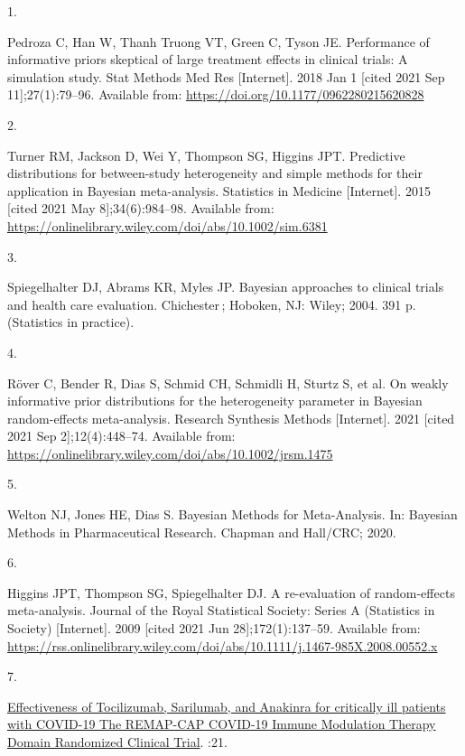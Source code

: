 \documentclass[
  12pt,
]{article}
\newlength{\cslhangindent}
\newlength{\csllabelwidth}
\newlength{\cslentryspacingunit} %
\newenvironment{CSLReferences}[2] %
 {%
  \setlength{\parindent}{0pt}
  \ifodd #1
  \let\oldpar\par
  \def\par{\hangindent=\cslhangindent\oldpar}
  \fi
  \setlength{\parskip}{#2\cslentryspacingunit}
 }%
 {}
\newcommand{\CSLLeftMargin}[1]{\parbox[t]{\csllabelwidth}{#1}}
\newcommand{\CSLRightInline}[1]{\parbox[t]{\linewidth - \csllabelwidth}{#1}\break}
\begin{document}
\hypertarget{refs}{}
\begin{CSLReferences}{0}{0}
\leavevmode{}%
\CSLLeftMargin{1. }
\CSLRightInline{Pedroza C, Han W, Thanh Truong VT, Green C, Tyson JE.
Performance of informative priors skeptical of large treatment effects
in clinical trials: A simulation study. Stat Methods Med Res
{[}Internet{]}. 2018 Jan 1 {[}cited 2021 Sep 11{]};27(1):79--96.
Available from: \url{https://doi.org/10.1177/0962280215620828}}

\leavevmode{}%
\CSLLeftMargin{2. }
\CSLRightInline{Turner RM, Jackson D, Wei Y, Thompson SG, Higgins JPT.
Predictive distributions for between-study heterogeneity and simple
methods for their application in Bayesian meta-analysis. Statistics in
Medicine {[}Internet{]}. 2015 {[}cited 2021 May 8{]};34(6):984--98.
Available from:
\url{https://onlinelibrary.wiley.com/doi/abs/10.1002/sim.6381}}

\leavevmode{}%
\CSLLeftMargin{3. }
\CSLRightInline{Spiegelhalter DJ, Abrams KR, Myles JP. Bayesian
approaches to clinical trials and health care evaluation. Chichester\,;
Hoboken, NJ: Wiley; 2004. 391 p. (Statistics in practice). }

\leavevmode{}%
\CSLLeftMargin{4. }
\CSLRightInline{Röver C, Bender R, Dias S, Schmid CH, Schmidli H, Sturtz
S, et al. On weakly informative prior distributions for the
heterogeneity parameter in Bayesian random-effects meta-analysis.
Research Synthesis Methods {[}Internet{]}. 2021 {[}cited 2021 Sep
2{]};12(4):448--74. Available from:
\url{https://onlinelibrary.wiley.com/doi/abs/10.1002/jrsm.1475}}

\leavevmode{}%
\CSLLeftMargin{5. }
\CSLRightInline{Welton NJ, Jones HE, Dias S. Bayesian Methods for
Meta-Analysis. In: Bayesian Methods in Pharmaceutical Research. Chapman
and Hall/CRC; 2020. }

\leavevmode{}%
\CSLLeftMargin{6. }
\CSLRightInline{Higgins JPT, Thompson SG, Spiegelhalter DJ. A
re-evaluation of random-effects meta-analysis. Journal of the Royal
Statistical Society: Series A (Statistics in Society) {[}Internet{]}.
2009 {[}cited 2021 Jun 28{]};172(1):137--59. Available from:
\url{https://rss.onlinelibrary.wiley.com/doi/abs/10.1111/j.1467-985X.2008.00552.x}}

\leavevmode{}%
\CSLLeftMargin{7. }
\CSLRightInline{\href{https://doi.org/10.1101/2021.06.18.21259133}{Effectiveness
of Tocilizumab, Sarilumab, and Anakinra for critically ill patients with
COVID-19 The REMAP-CAP COVID-19 Immune Modulation Therapy Domain
Randomized Clinical Trial}. :21. }


\end{CSLReferences}
\end{document}
